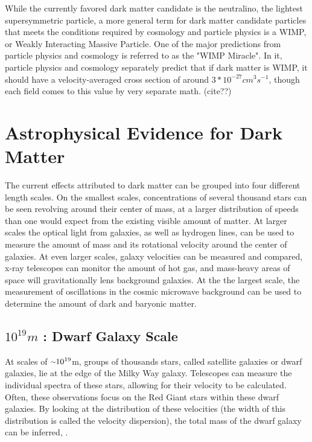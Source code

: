  While the currently favored dark matter candidate is the neutralino, the lightest supersymmetric particle, a more general term for dark matter candidate particles that meets the conditions required by cosmology and particle physics is a WIMP, or Weakly Interacting Massive Particle.
  One of the major predictions from particle physics and cosmology is referred to as the "WIMP Miracle".
  In it, particle physics and cosmology separately predict that if dark matter is WIMP, it should have a velocity-averaged cross section of around $3*10^{-27}cm^{3}s^{-1}$, though each field comes to this value by very separate math. {\color{red}(cite??)}

\section{Astrophysical Evidence for Dark Matter}
  The current effects attributed to dark matter can be grouped into four different length scales.
  On the smallest scales, concentrations of several thousand stars can be seen revolving around their center of mass, at a larger distribution of speeds than one would expect from the existing visible amount of matter.
  At larger scales the optical light from galaxies, as well as hydrogen lines, can be used to measure the amount of mass and its rotational velocity around the center of galaxies.
  At even larger scales, galaxy velocities can be measured and compared, x-ray telescopes can monitor the amount of hot gas, and mass-heavy areas of space will gravitationally lens background galaxies.
  At the the largest scale, the measurement of oscillations in the cosmic microwave background can be used to determine the amount of dark and baryonic matter.
  
  \subsection{$10^{19}m$ : Dwarf Galaxy Scale}
    At scales of $\nicetilde 10^{19}$m, groups of thousands stars, called satellite galaxies or dwarf galaxies, lie at the edge of the Milky Way galaxy.
    Telescopes can measure the individual spectra of these stars, allowing for their velocity to be calculated.
    Often, these observations focus on the Red Giant stars within these dwarf galaxies\cite{dwarf_gal_red_giant}.
    By looking at the distribution of these velocities (the width of this distribution is called the velocity dispersion), the total mass of the dwarf galaxy can be inferred\cite{dwarf_gal_vel_dispersion}, \cite{dwarf_gal_vel_dispersion2}.

